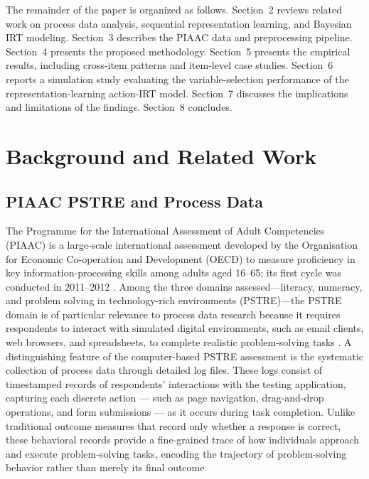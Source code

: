 \documentclass[A4paper,11pt]{article}
\begin{document}
The remainder of the paper is organized as follows. Section~2 reviews related work on process data analysis, sequential representation learning, and Bayesian IRT modeling. Section~3 describes the PIAAC data and preprocessing pipeline. Section~4 presents the proposed methodology. Section~5 presents the empirical results, including cross-item patterns and item-level case studies. Section~6 reports a simulation study evaluating the variable-selection performance of the representation-learning action-IRT model. Section~7 discusses the implications and limitations of the findings. Section~8 concludes.

\section{Background and Related Work}

\subsection{PIAAC PSTRE and Process Data}\label{sec:piaac_data}

The Programme for the International Assessment of Adult Competencies (PIAAC) is a large-scale international assessment developed by the Organisation for Economic Co-operation and Development (OECD) to measure proficiency in key information-processing skills among adults aged 16--65; its first cycle was conducted in 2011--2012 \citep{oecd2013piaac}. Among the three domains assessed---literacy, numeracy, and problem solving in technology-rich environments (PSTRE)---the PSTRE domain is of particular relevance to process data research because it requires respondents to interact with simulated digital environments, such as email clients, web browsers, and spreadsheets, to complete realistic problem-solving tasks \citep{piaac2009pstre}. A distinguishing feature of the computer-based PSTRE assessment is the systematic collection of process data through detailed log files. These logs consist of timestamped records of respondents' interactions with the testing application, capturing each discrete action --- such as page navigation, drag-and-drop operations, and form submissions --- as it occurs during task completion. Unlike traditional outcome measures that record only whether a response is correct, these behavioral records provide a fine-grained trace of how individuals approach and execute problem-solving tasks, encoding the trajectory of problem-solving behavior rather than merely its final outcome.
\end{document}
